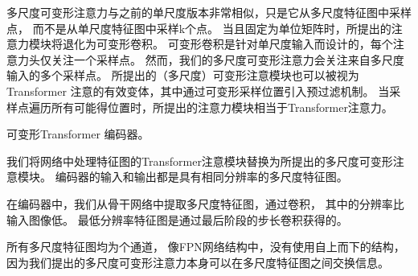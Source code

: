 多尺度可变形注意力与之前的单尺度版本非常相似，只是它从多尺度特征图中采样点，
而不是从单尺度特征图中采样k个点。
当且固定为单位矩阵时，所提出的注意力模块将退化为可变形卷积。
可变形卷积是针对单尺度输入而设计的，每个注意力头仅关注一个采样点。
然而，我们的多尺度可变形注意力会关注来自多尺度输入的多个采样点。
所提出的（多尺度）可变形注意模块也可以被视为
Transformer 注意的有效变体，其中通过可变形采样位置引入预过滤机制。
当采样点遍历所有可能得位置时，所提出的注意力模块相当于Transformer注意力。


可变形Transformer 编码器。

我们将网络中处理特征图的Transformer注意模块替换为所提出的多尺度可变形注意模块。
编码器的输入和输出都是具有相同分辨率的多尺度特征图。

在编码器中，我们从骨干网络中提取多尺度特征图，通过卷积，
其中的分辨率比输入图像低。
最低分辨率特征图是通过最后阶段的步长卷积获得的。

所有多尺度特征图均为个通道，
像FPN网络结构中，没有使用自上而下的结构，因为我们提出的多尺度可变形注意力本身可以在多尺度特征图之间交换信息。












% 
% 
% 
% 







